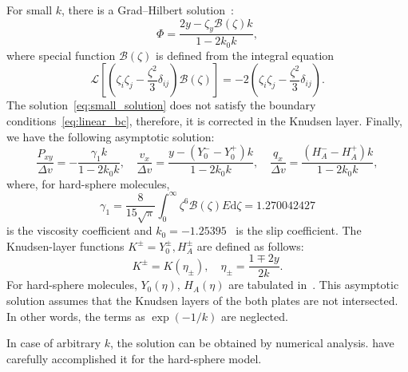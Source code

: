\documentclass[review]{elsarticle}
\newcommand{\dd}{\mathrm{d}}
\begin{document}
For small \(k\), there is a Grad--Hilbert solution~\citep[see e.g.][]{Ohwada1990, Sone2007}:
\begin{equation}\label{eq:small_solution}
    \Phi = \frac{2y - \zeta_y \mathcal{B}(\zeta) k}{1-2k_0k},
\end{equation}
where special function \(\mathcal{B}(\zeta)\) is defined from the integral equation
\begin{equation}\label{eq:transport_B}
    \mathcal{L}\left[\left(\zeta_i\zeta_j-\frac{\zeta^2}3\delta_{ij}\right) \mathcal{B}(\zeta)\right]
        = -2\left(\zeta_i\zeta_j-\frac{\zeta^2}3\delta_{ij}\right).
\end{equation}
The solution~\eqref{eq:small_solution} does not satisfy the boundary conditions~\eqref{eq:linear_bc},
therefore, it is corrected in the Knudsen layer. Finally, we have the following asymptotic solution:
\begin{equation}\label{eq:small_macro}
    \frac{P_{xy}}{\Delta{v}} = - \frac{\gamma_1 k}{1-2k_0k}, \quad
    \frac{v_x}{\Delta{v}} = \frac{y - (Y_0^--Y_0^+)k}{1-2k_0k}, \quad
    \frac{q_x}{\Delta{v}} = \frac{(H_A^--H_A^+)k}{1-2k_0k},
\end{equation}
where, for hard-sphere molecules,
\begin{equation}\label{eq:gamma_1}
    \gamma_1 = \frac{8}{15\sqrt{\pi}}\int_0^\infty \zeta^6 \mathcal{B}(\zeta)E\dd\zeta = 1.270042427
\end{equation}
is the viscosity coefficient and \(k_0 = -1.25395\)~\citep{Takata2015} is the slip coefficient.
The Knudsen-layer functions \(K^\pm = Y_0^\pm, H_A^\pm\) are defined as follows:
\begin{equation}\label{eq:linear_knudsen_functions}
     K^\pm = K(\eta_\pm), \quad \eta_\pm = \frac{1 \mp 2y}{2k}.
\end{equation}
For hard-sphere molecules, \(Y_0(\eta)\), \(H_A(\eta)\)
are tabulated in~\citet{Ohwada1989a, Sone2002, Sone2007, Takata2015}.
This asymptotic solution assumes that the Knudsen layers of the both plates are not intersected.
In other words, the terms as \(\exp(-1/k)\) are neglected.

In case of arbitrary \(k\), the solution can be obtained by numerical analysis.
\citet{Ohwada1990} have carefully accomplished it for the hard-sphere model.
\end{document}
